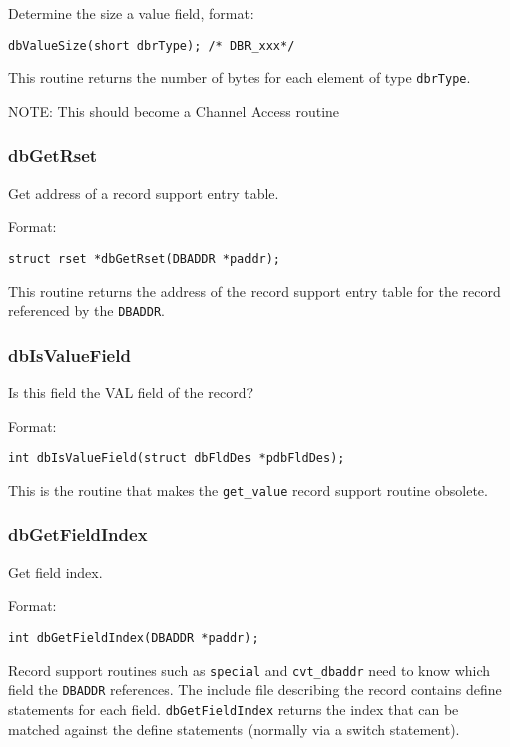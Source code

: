 Determine the size a value field, format:

\begin{verbatim}
dbValueSize(short dbrType); /* DBR_xxx*/
\end{verbatim}

This routine returns the number of bytes for each element of type \verb|dbrType|.

NOTE: This should become a Channel Access routine

\subsubsection{dbGetRset}

Get address of a record support entry table.

Format:

\begin{verbatim}
struct rset *dbGetRset(DBADDR *paddr);
\end{verbatim}

This routine returns the address of the record support entry table for the record referenced by the \verb|DBADDR|.

\subsubsection{dbIsValueField}

Is this field the VAL field of the record?

Format:

\begin{verbatim}
int dbIsValueField(struct dbFldDes *pdbFldDes);
\end{verbatim}

This is the routine that makes the \verb|get_value| record support routine obsolete.

\subsubsection{dbGetFieldIndex}

Get field index.

Format:

\begin{verbatim}
int dbGetFieldIndex(DBADDR *paddr);
\end{verbatim}

Record support routines such as \verb|special| and \verb|cvt_dbaddr| need to know which field the \verb|DBADDR| references.
The include file describing the record contains define statements for each field.
\verb|dbGetFieldIndex| returns the index that can be matched against the define statements (normally via a switch statement).

